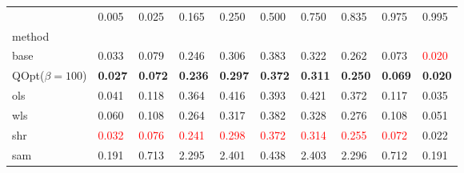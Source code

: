 \begin{tabular}{llllllllll}
\toprule
 & 0.005 & 0.025 & 0.165 & 0.250 & 0.500 & 0.750 & 0.835 & 0.975 & 0.995 \\
method &  &  &  &  &  &  &  &  &  \\
\midrule
base & 0.033 & 0.079 & 0.246 & 0.306 & 0.383 & 0.322 & 0.262 & 0.073 & \textcolor{red}{0.020} \\
\midrule
QOpt($\beta=100$) & \textbf{0.027} & \textbf{0.072} & \textbf{0.236} & \textbf{0.297} & \textbf{0.372} & \textbf{0.311} & \textbf{0.250} & \textbf{0.069} & \textbf{0.020} \\
ols & 0.041 & 0.118 & 0.364 & 0.416 & 0.393 & 0.421 & 0.372 & 0.117 & 0.035 \\
wls & 0.060 & 0.108 & 0.264 & 0.317 & 0.382 & 0.328 & 0.276 & 0.108 & 0.051 \\
shr & \textcolor{red}{0.032} & \textcolor{red}{0.076} & \textcolor{red}{0.241} & \textcolor{red}{0.298} & \textcolor{red}{0.372} & \textcolor{red}{0.314} & \textcolor{red}{0.255} & \textcolor{red}{0.072} & 0.022 \\
sam & 0.191 & 0.713 & 2.295 & 2.401 & 0.438 & 2.403 & 2.296 & 0.712 & 0.191 \\
\bottomrule
\end{tabular}